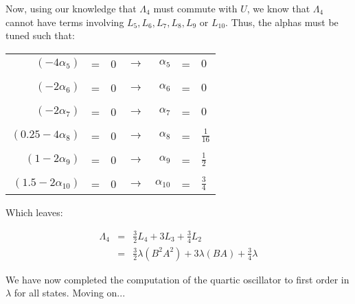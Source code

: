\documentclass{article}
\begin{document}
Now, using our knowledge that $\Lambda_{4}$ must commute with $U$, we know that $\Lambda_{4}$ cannot have terms involving $L_{5}, L_{6}, L_{7}, L_{8}, L_{9}$ or $L_{10}$.  Thus, the alphas must be tuned such that:

\begin{table}[!htp]
\begin{center}
\begin{tabular}{rclcrcl}
 $(-4\alpha_5)       $ & = & 0 & $\rightarrow$ & $\alpha_5   $ & = & $0           $  \\ 
                       &   &   &               &               &   &                 \\
 $(-2\alpha_6)       $ & = & 0 & $\rightarrow$ & $\alpha_6   $ & = & $0           $  \\
                       &   &   &               &               &   &                 \\
 $(-2\alpha_7)       $ & = & 0 & $\rightarrow$ & $\alpha_7   $ & = & $0           $  \\
                       &   &   &               &               &   &                 \\
 $(0.25-4\alpha_8)   $ & = & 0 & $\rightarrow$ & $\alpha_8   $ & = & $\frac{1}{16}$  \\
                       &   &   &               &               &   &                 \\
 $(1-2\alpha_9)      $ & = & 0 & $\rightarrow$ & $\alpha_9   $ & = & $\frac{1}{2} $  \\
                       &   &   &               &               &   &                 \\
 $(1.5-2\alpha_{10}) $ & = & 0 & $\rightarrow$ & $\alpha_{10}$ & = & $\frac{3}{4} $ 
\label{tabSolvedAlphaValues}
\end{tabular}
\end{center}
\end{table}

\clearpage
\newpage

Which leaves:

\begin{eqnarray}
\Lambda_{4} & = & \frac{3}{2}L_{4} + 3L_{3} + \frac{3}{4}L_{2} \\
            & = & \frac{3}{2}\lambda(B^{2}A^{2}) + 3\lambda(BA) + \frac{3}{4}\lambda 
\end{eqnarray}

We have now completed the computation of the quartic oscillator to first order in $\lambda$ for all states.  Moving on...
\end{document}
